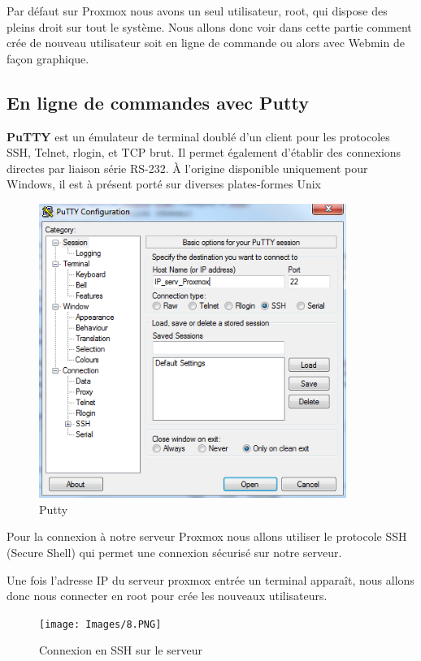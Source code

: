 \documentclass[12pt,a4paper]{article}
\begin{document}
Par défaut sur Proxmox nous avons un seul utilisateur, root, qui dispose des pleins droit sur tout le système. Nous allons donc voir dans cette partie comment crée de nouveau utilisateur soit en ligne de commande ou alors avec Webmin de façon graphique.

\subsection{En ligne de commandes avec Putty}
\textbf{PuTTY} est un émulateur de terminal doublé d'un client pour les protocoles SSH, Telnet, rlogin, et TCP brut. Il permet également d'établir des connexions directes par liaison série RS-232. À l'origine disponible uniquement pour Windows, il est à présent porté sur diverses plates-formes Unix 

\begin{figure}[!ht]
\center
\includegraphics[width=10cm]{Images/7.PNG}  
\caption{Putty}
\end{figure}

\newpage
Pour la connexion à notre serveur Proxmox nous allons utiliser le protocole SSH (Secure Shell) qui permet une connexion sécurisé sur notre serveur.

Une fois l'adresse IP du serveur proxmox entrée un terminal apparaît, nous allons donc nous connecter en root pour crée les nouveaux utilisateurs.

\begin{figure}[!ht]
\center
\texttt{[image: Images/8.PNG]}  
\caption{Connexion en SSH sur le serveur}
\end{figure}
\end{document}
